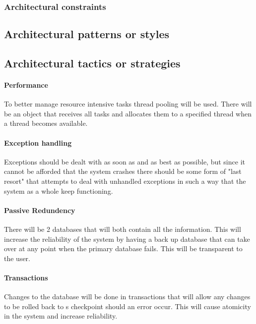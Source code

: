 \documentclass[english]{article}
\begin{document}
				\subsubsection{Architectural constraints}
			
		\subsection{Architectural patterns or styles}
		
		\subsection{Architectural tactics or strategies}
			\paragraph{Performance}\indent
			To better manage resource intensive tasks thread pooling will be used. There will be an object that receives all tasks and allocates them to a specified thread when a thread becomes available.
			
			\paragraph{Exception handling}\indent
			Exceptions should be dealt with as soon as and as best as possible, but since it cannot be afforded that the system crashes there should be some form of "last resort" that attempts to deal with unhandled exceptions in such a way that the system as a whole keep functioning.
			
			\paragraph{Passive Redundency}\indent
			There will be 2 databases that will both contain all the information. This will increase the reliability of the system by having a back up database that can take over at any point when the primary database fails. This will be transparent to the user.
			
			\paragraph{Transactions}\indent
			Changes to the database will be done in transactions that will allow any changes to be rolled back to s checkpoint should an error occur. This will cause atomicity in the system and increase reliability.
			
\end{document}
